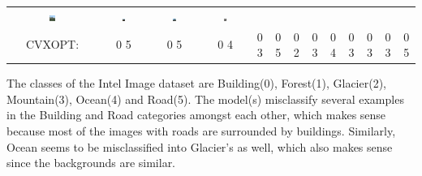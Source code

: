 \documentclass[12pt]{article}
\begin{document}
\begin{enumerate}[label=(\alph*)]
\begin{center}
\begin{tabular}{c c c c c c c c c c c c c}
            \includegraphics[width=0.065\textwidth]{Images/Q2_multi/misclassified/cvxopt9_3_0.png} &
            \includegraphics[width=0.065\textwidth]{Images/Q2_multi/misclassified/cvxopt10_3_0.png} &
            \includegraphics[width=0.065\textwidth]{Images/Q2_multi/misclassified/cvxopt11_3_0.png} &
            \includegraphics[width=0.065\textwidth]{Images/Q2_multi/misclassified/cvxopt12_5_0.png} \\
            CVXOPT: &
            {\color{red} 0} {\color{green} 5} &
            {\color{red} 0} {\color{green} 5} &
            {\color{red} 0} {\color{green} 4} &
            {\color{red} 0} {\color{green} 3} &
            {\color{red} 0} {\color{green} 5} &
            {\color{red} 0} {\color{green} 2} &
            {\color{red} 0} {\color{green} 3} &
            {\color{red} 0} {\color{green} 4} &
            {\color{red} 0} {\color{green} 3} &
            {\color{red} 0} {\color{green} 3} &
            {\color{red} 0} {\color{green} 3} &
            {\color{red} 0} {\color{green} 5} \\
        \end{tabular}
    \end{center}

    The classes of the Intel Image dataset are Building(0), Forest(1), Glacier(2), Mountain(3), Ocean(4) and Road(5). The model(s) misclassify several examples in the Building and Road categories amongst each other, which makes sense because most of the images with roads are surrounded by buildings. Similarly, Ocean seems to be misclassified into Glacier's as well, which also makes sense since the backgrounds are similar.


\end{enumerate}
\end{document}
